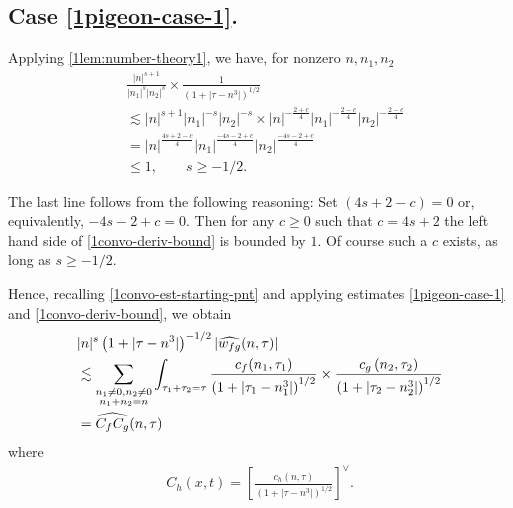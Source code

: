 \subsection{Case \eqref{1pigeon-case-1}.} 
Applying \cref{1lem:number-theory1}, we have, for nonzero $ n, n_1, n_2 $
%
\begin{equation}
	\label{1convo-deriv-bound}
	\begin{split}
		& \frac{|n|^{s+1}}{|n_1|^s 
		| n_2|^s}
		\times
		\frac{1}{(1 + | \tau -n^3 |)^{1/2}}
		\\
		& \lesssim | n |^{s+1}| n_1 |^{-s}| n_2 |^{-s} \times | n
		|^{-\frac{2+c}{4}}| n_1 |^{-\frac{2-c}{4}}| n_2 |^{-\frac{2-c}{4}} 
		\\
		& = | n |^{\frac{4s +2 -c}{4}} | n_1 |^{\frac{-4s -2 +c}{4}} | n_2
		|^{\frac{-4s -2 +c}{4}}
		\\
		& \le 1, \qquad s \ge -1/2.
	\end{split}  
\end{equation}
%
%
\begin{framed}
\begin{remark}
	\label{1rem:s-val}
	The last line follows from the following reasoning: Set $(4s + 2 -c) = 0$
or, equivalently, $-4s -2 +c = 0$. Then for any $c \ge 0$ such that $c = 4s+2$
the left hand side of
\eqref{1convo-deriv-bound} is bounded by $1$. Of course such a $c$ exists, as
long as $s \ge -1/2$.
\end{remark}
\end{framed}
%
%
%
Hence, recalling \eqref{1convo-est-starting-pnt} and applying estimates 
\eqref{1pigeon-case-1} and \eqref{1convo-deriv-bound}, we obtain
%
%
\begin{equation}
	\label{1non-lin-rep-with-bound}
	\begin{split}
		& |n|^s \left( 1 + | \tau - n^3 | \right)^{-1/2} | 
		\widehat{w_{fg}}(n, \tau) | 
		\\
		& \lesssim \sum_{\substack{n_1 \neq0, n_2 \neq 0 \\n_1 + n_2 =n}} \int_{\tau_1 + \tau_2 = \tau}\frac{c_f(n_1, \tau_1)}{\left( 1 + | 
		\tau_1 -  n_1^3| \right)^{1/2}}
		\times \frac{c_g\left( n_2, \tau_2\right)}{\left( 1 + | \tau_2 -n_2^3|
		\right)^{1/2}}
		\\
		& = \widehat{C_f C_g}(n, \tau)
	\end{split}
\end{equation}
%
%
where
\begin{equation*}
	\begin{split}
		C_h(x,t) =
		\left[ \frac{c_h(n, \tau)}{\left( 1 + | \tau - n^3 | 
		\right)^{1/2}}\right]^\vee .	
	\end{split}
\end{equation*}

